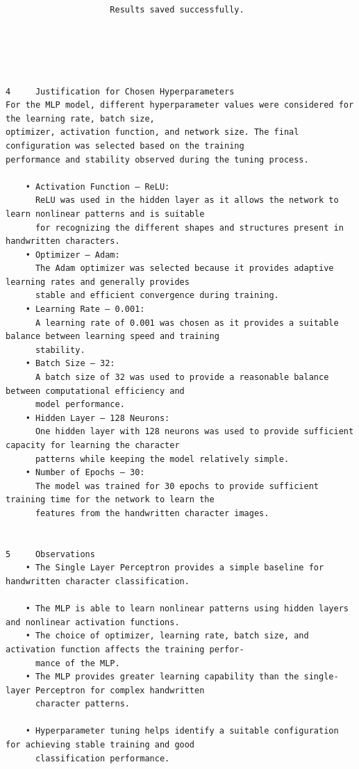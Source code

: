 \documentclass[12pt,a4paper]{article}
\begin{document}
\begin{lstlisting}
                     Results saved successfully.





4     Justification for Chosen Hyperparameters
For the MLP model, different hyperparameter values were considered for the learning rate, batch size,
optimizer, activation function, and network size. The final configuration was selected based on the training
performance and stability observed during the tuning process.

    • Activation Function – ReLU:
      ReLU was used in the hidden layer as it allows the network to learn nonlinear patterns and is suitable
      for recognizing the different shapes and structures present in handwritten characters.
    • Optimizer – Adam:
      The Adam optimizer was selected because it provides adaptive learning rates and generally provides
      stable and efficient convergence during training.
    • Learning Rate – 0.001:
      A learning rate of 0.001 was chosen as it provides a suitable balance between learning speed and training
      stability.
    • Batch Size – 32:
      A batch size of 32 was used to provide a reasonable balance between computational efficiency and
      model performance.
    • Hidden Layer – 128 Neurons:
      One hidden layer with 128 neurons was used to provide sufficient capacity for learning the character
      patterns while keeping the model relatively simple.
    • Number of Epochs – 30:
      The model was trained for 30 epochs to provide sufficient training time for the network to learn the
      features from the handwritten character images.


5     Observations
    • The Single Layer Perceptron provides a simple baseline for handwritten character classification.

    • The MLP is able to learn nonlinear patterns using hidden layers and nonlinear activation functions.
    • The choice of optimizer, learning rate, batch size, and activation function affects the training perfor-
      mance of the MLP.
    • The MLP provides greater learning capability than the single-layer Perceptron for complex handwritten
      character patterns.

    • Hyperparameter tuning helps identify a suitable configuration for achieving stable training and good
      classification performance.

\end{lstlisting}
\end{document}
